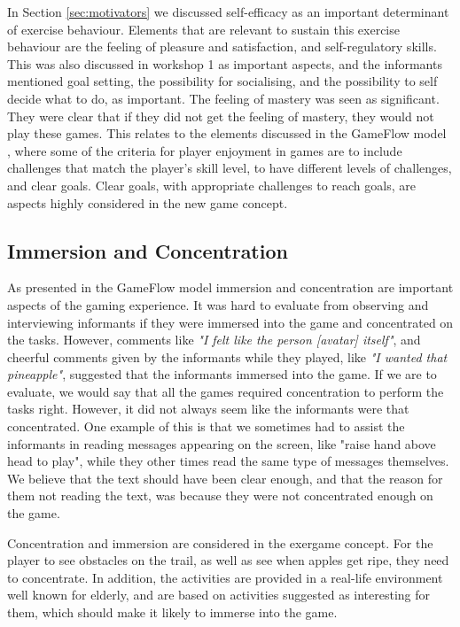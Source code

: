 In Section \ref{sec:motivators} we discussed self-efficacy as an important determinant of exercise behaviour. Elements that are relevant to sustain this exercise behaviour are the feeling of pleasure and satisfaction, and self-regulatory skills. This was also discussed in workshop 1 as important aspects, and the informants mentioned goal setting, the possibility for socialising, and the possibility to self decide what to do, as important. The feeling of mastery was seen as significant. They were clear that if they did not get the feeling of mastery, they would not play these games. This relates to the elements discussed in the GameFlow model \cite{sweetser}, where some of the criteria for player enjoyment in games are to include challenges that match the player's skill level, to have different levels of challenges, and clear goals. Clear goals, with appropriate challenges to reach goals, are aspects highly considered in the new game concept.
 
\subsection{Immersion and Concentration}
As presented in the GameFlow model \cite{sweetser} immersion and concentration are important aspects of the gaming experience. It was hard to evaluate from observing and interviewing informants if they were immersed into the game and concentrated on the tasks. However, comments like \emph{"I felt like the person [avatar] itself"}, and cheerful comments given by the informants while they played, like \emph{"I wanted that pineapple"}, suggested that the informants immersed into the game. If we are to evaluate, we would say that all the games required concentration to perform the tasks right. However, it did not always seem like the informants were that concentrated. One example of this is that we sometimes had to assist the informants in reading messages appearing on the screen, like "raise hand above head to play", while they other times read the same type of messages themselves. We believe that the text should have been clear enough, and that the reason for them not reading the text, was because they were not concentrated enough on the game. 

Concentration and immersion are considered in the exergame concept. For the player to see obstacles on the trail, as well as see when apples get ripe, they need to concentrate. In addition, the activities are provided in a real-life environment well known for elderly, and are based on activities suggested as interesting for them, which should make it likely to immerse into the game.


